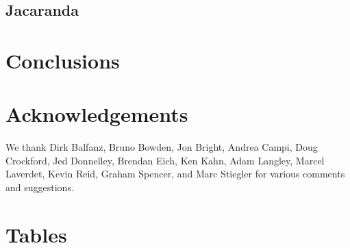 \documentclass[letterpaper,twocolumn,10pt]{article}
\begin{document}

\subsection{Jacaranda}


\section{Conclusions}


\section{Acknowledgements}

We thank 
Dirk Balfanz,
Bruno Bowden,
Jon Bright,
Andrea Campi,
Doug Crockford,
Jed Donnelley,
Brendan Eich,
Ken Kahn,
Adam Langley,
Marcel Laverdet,
Kevin Reid,
Graham Spencer,
and
Marc Stiegler
for various comments and suggestions.

\appendix

\section{Tables}
\end{document}
